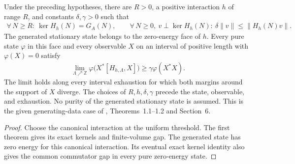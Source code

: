 \begin{lemma}
    \label{thm:faithful_generators_constructed_finite_quasi_local_gap}
    \leanok
    Under the preceding hypotheses, there are $R>0$, a positive interaction $h$
    of range $R$, and constants $\delta,\gamma>0$ such that
    \begin{align}
        \forall\,N\geq R:\ \ker H_h(N)=G_A(N),\qquad
        \forall\,N\geq0,\ v\perp\ker H_h(N):\ \delta\|v\|\leq\|H_h(N)v\|.
    \end{align}
    The generated stationary state belongs to the zero-energy face of $h$.
    Every pure state $\varphi$ in this face and every observable $X$ on an
    interval of positive length with $\varphi(X)=0$ satisfy
    \begin{align}
        \lim_{\Lambda\nearrow\mathbb Z}
        \varphi\bigl(X^*[H_{h,\Lambda},X]\bigr)
        \geq\gamma\varphi(X^*X).
    \end{align}
    The limit holds along every interval exhaustion for which both margins
    around the support of $X$ diverge. The choices of $R,h,\delta,\gamma$
    precede the state, observable, and exhaustion. No purity of the generated
    stationary state is assumed. This is the given generating-data case of
    \cite{Nachtergaele1996Spectral}, Theorems~1.1--1.2 and Section~6.
\end{lemma}
\begin{proof}\leanok
    Choose the canonical interaction at the uniform threshold. The first theorem
    gives its exact kernels and finite-volume gap. The generated state has zero
    energy for this canonical interaction. Its eventual exact kernel identity
    also gives the common commutator gap in every pure zero-energy state.
\end{proof}

